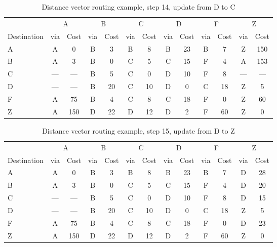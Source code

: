 \begin{table}
    \caption{Distance vector  routing example, step 14, update from D to C }
    \label{tab:dv:step:14}
\begin{tabular}{l|c|c|c|c|c|c|c|c|c|c|c|c}
    \toprule
      & \multicolumn{2}{c|}{A}&\multicolumn{2}{c|}{B}&\multicolumn{2}{c|}{C}&\multicolumn{2}{c|}{D}&\multicolumn{2}{c|}{F}&\multicolumn{2}{c|}{Z} \\
    Destination & via&Cost&via&Cost&via&Cost&via&Cost&via&Cost&via&Cost \\ 
    \midrule
    A & A & 0 &B & 3 &B & 8 &B & 23 &B & 7 &Z & 150 
 \\B & A & 3 &B & 0 &C & 5 &C & 15 &F & 4 &A & 153 
 \\C & --- & ---&B & 5 &C & 0 &D & 10 &F & 8 &--- & ---
 \\D & --- & ---&B & 20 &C & 10 &D & 0 &C & 18 &Z & 5 
 \\F & A & 75 &B & 4 &C & 8 &C & 18 &F & 0 &Z & 60 
 \\Z & A & 150 &D & 22 &D & 12 &D & 2 &F & 60 &Z & 0 
    \\ \bottomrule 
\end{tabular}
\end{table}
    

\begin{table}
    \caption{Distance vector  routing example, step 15, update from D to Z }
    \label{tab:dv:step:15}
\begin{tabular}{l|c|c|c|c|c|c|c|c|c|c|c|c}
    \toprule
      & \multicolumn{2}{c|}{A}&\multicolumn{2}{c|}{B}&\multicolumn{2}{c|}{C}&\multicolumn{2}{c|}{D}&\multicolumn{2}{c|}{F}&\multicolumn{2}{c|}{Z} \\
    Destination & via&Cost&via&Cost&via&Cost&via&Cost&via&Cost&via&Cost \\ 
    \midrule
    A & A & 0 &B & 3 &B & 8 &B & 23 &B & 7 &D & 28 
 \\B & A & 3 &B & 0 &C & 5 &C & 15 &F & 4 &D & 20 
 \\C & --- & ---&B & 5 &C & 0 &D & 10 &F & 8 &D & 15 
 \\D & --- & ---&B & 20 &C & 10 &D & 0 &C & 18 &Z & 5 
 \\F & A & 75 &B & 4 &C & 8 &C & 18 &F & 0 &D & 23 
 \\Z & A & 150 &D & 22 &D & 12 &D & 2 &F & 60 &Z & 0 
    \\ \bottomrule 
\end{tabular}
\end{table}
    

